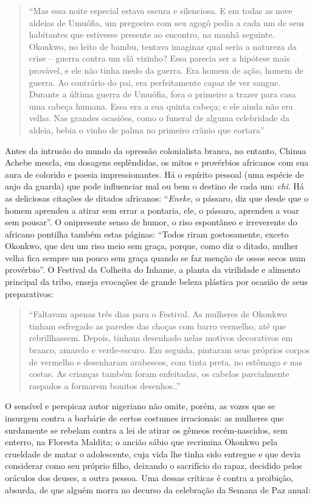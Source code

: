 \documentclass[
  letterpaper,
  DIV=11,
  numbers=noendperiod]{scrreprt}
\begin{document}
\begin{quote}
``Mas essa noite especial estava escura e silenciosa. E em todas as nove
aldeias de Umuófia, um pregoeiro com seu agogô pedia a cada um de seus
habitantes que estivesse presente ao encontro, na manhã seguinte.
Okonkwo, no leito de bambu, tentava imaginar qual seria a natureza da
crise -- guerra contra um clã vizinho? Essa parecia ser a hipótese mais
provável, e ele não tinha medo da guerra. Era homem de ação, homem de
guerra. Ao contrário do pai, era perfeitamente capaz de ver sangue.
Durante a última guerra de Umuófia, fora o primeiro a trazer para casa
uma cabeça humana. Essa era a sua quinta cabeça; e ele ainda não era
velho. Nas grandes ocasiões, como o funeral de alguma celebridade da
aldeia, bebia o vinho de palma no primeiro crânio que cortara''
\end{quote}

Antes da intrusão do mundo da opressão colonialista branca, no entanto,
Chinua Achebe mescla, em dosagens esplêndidas, os mitos e provérbios
africanos com sua aura de colorido e poesia impressionantes. Há o
espírito pessoal (uma espécie de anjo da guarda) que pode influenciar
mal ou bem o destino de cada um: \emph{chi}. Há as deliciosas citações
de ditados africanos: ``\emph{Eneke}, o pássaro, diz que desde que o
homem aprendeu a atirar sem errar a pontaria, ele, o pássaro, aprendeu a
voar sem pousar''. O onipresente senso de humor, o riso espontâneo e
irreverente do africano pontilha também estas páginas: ``Todos riram
gostosamente, exceto Okonkwo, que deu um riso meio sem graça, porque,
como diz o ditado, mulher velha fica sempre um pouco sem graça quando se
faz menção de ossos secos num provérbio''. O Festival da Colheita do
Inhame, a planta da virilidade e alimento principal da tribo, enseja
evocações de grande beleza plástica por ocasião de seus preparativos:

\begin{quote}
``Faltavam apenas três dias para o Festival. As mulheres de Okonkwo
tinham esfregado as paredes das choças com barro vermelho, até que
rebrillhassem. Depois, tinham desenhado nelas motivos decorativos em
branco, amarelo e verde-escuro. Em seguida, pintaram seus próprios
corpos de vermelho e desenharam arabescos, com tinta preta, no estômago
e nas costas. As crianças também foram enfeitadas, os cabelos
parcialmente raspados a formarem bonitos desenhos..''
\end{quote}

O sensível e perspicaz autor nigeriano não omite, porém, as vozes que se
insurgem contra a barbárie de certos costumes irracionais: as mulheres
que surdamente se rebelam contra a lei de atirar os gêmeos
recém-nascidos, sem enterro, na Floresta Maldita; o ancião sábio que
recrimina Okonkwo pela crueldade de matar o adolescente, cuja vida lhe
tinha sido entregue e que devia considerar como seu próprio filho,
deixando o sacrifício do rapaz, decidido pelos oráculos dos deuses, a
outra pessoa. Uma dessas críticas é contra a proibição, absurda, de que
alguém morra no decurso da celebração da Semana de Paz anual:
\end{document}

